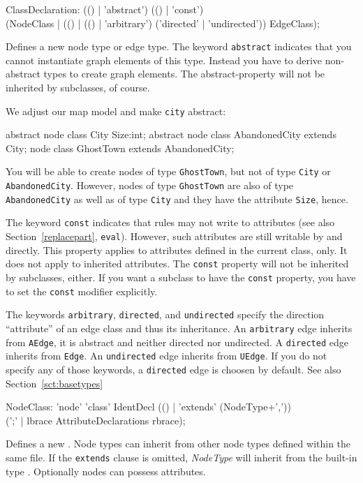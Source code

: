 \begin{rail}  
  ClassDeclaration: (() | 'abstract') (() | 'const') \\
    (NodeClass | (() | (() | 'arbitrary') ('directed' | 'undirected')) EdgeClass);
\end{rail}
Defines a new node type or edge type. The keyword \texttt{abstract} indicates that you cannot instantiate graph elements of this type. Instead you have to derive non-abstract types to create graph elements. The abstract-property will not be inherited by subclasses, of course.

\begin{example}
We adjust our map model and make \texttt{city} abstract:
\begin{grgen}
abstract node class City {
	Size:int;
}
abstract node class AbandonedCity extends City;
node class GhostTown extends AbandonedCity;
\end{grgen}
You will be able to create nodes of type \texttt{GhostTown}, but not of type \texttt{City} or \texttt{AbandonedCity}. However, nodes of type \texttt{GhostTown} are also of type \texttt{AbandonedCity} as well as of type \texttt{City} and they have the attribute \texttt{Size}, hence.
\end{example}
The keyword \texttt{const} indicates that rules may not write to attributes (see also Section~\ref{replacepart}, \texttt{eval}). However, such attributes are still writable by \LibGr{} and \GrShell{} directly. This property applies to attributes defined in the current class, only. It does not apply to inherited attributes. The \texttt{const} property will not be inherited by subclasses, either. If you want a subclass to have the \texttt{const} property, you have to set the \texttt{const} modifier explicitly.

The keywords \texttt{arbitrary}, \texttt{directed}, and \texttt{undirected} specify the direction ``attribute'' of an edge class and thus its inheritance.
An \texttt{arbitrary} edge inherits from \texttt{AEdge}, it is abstract and neither directed nor undirected.
A \texttt{directed} edge inherits from \texttt{Edge}.
An \texttt{undirected} edge inherits from \texttt{UEdge}.
If you do not specify any of those keywords, a \texttt{directed} edge is choosen by default.
See also Section~\ref{sct:basetypes}

\begin{rail}  
  NodeClass: 'node' 'class' IdentDecl (() | 'extends' (NodeType+',')) \\ 
    (';' | lbrace AttributeDeclarations rbrace);
\end{rail}
Defines a new . Node types can inherit from other node types defined within the same file. If the \texttt{extends} clause is omitted, \emph{NodeType} will inherit from the built-in type \texttt{}. Optionally nodes can possess attributes.


